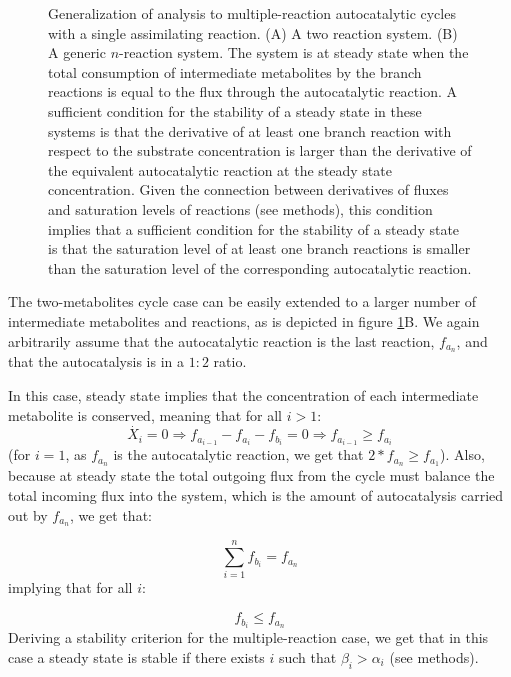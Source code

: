\begin{figure}[!htb]
  \centering
      
     \caption{
     Generalization of analysis to multiple-reaction autocatalytic cycles with a single assimilating reaction.
     (A) A two reaction system.
     (B) A generic $n$-reaction system.
     The system is at steady state when the total consumption of intermediate metabolites by the branch reactions is equal to the flux through the autocatalytic reaction.
     A sufficient condition for the stability of a steady state in these systems is that the derivative of at least one branch reaction with respect to the substrate concentration is larger than the derivative of the equivalent autocatalytic reaction at the steady state concentration.
     Given the connection between derivatives of fluxes and saturation levels of reactions (see methods), this condition implies that a sufficient condition for the stability of a steady state is that the saturation level of at least one branch reactions is smaller than the saturation level of the corresponding autocatalytic reaction.
 }
     \label{fig:multiple}
\end{figure}

    The two-metabolites cycle case can be easily extended to a larger number of intermediate metabolites and reactions, as is depicted in figure \ref{fig:multiple}B.
    We again arbitrarily assume that the autocatalytic reaction is the last reaction, $f_{a_n}$, and that the autocatalysis is in a $1:2$ ratio.

    In this case, steady state implies that the concentration of each intermediate metabolite is conserved, meaning that for all $i>1$:
    \begin{equation}
        \label{eq:complexdecrease}
      \dot{X_i}=0 \Rightarrow f_{a_{i-1}}-f_{a_i}-f_{b_i}=0 \Rightarrow f_{a_{i-1}} \geq f_{a_i}
    \end{equation}
    (for $i=1$, as $f_{a_n}$ is the autocatalytic reaction, we get that $2*f_{a_{n}} \geq f_{a_1}$).
    Also, because at steady state the total outgoing flux from the cycle must balance the total incoming flux into the system, which is the amount of autocatalysis carried out by $f_{a_n}$, we get that:

    \begin{equation*}
      \sum_{i=1}^n f_{b_i}=f_{a_n}
  \end{equation*}
implying that for all $i$:

    \begin{equation}
        \label{eq:complexsmallbranch}
        f_{b_i} \leq f_{a_n}
  \end{equation}
    Deriving a stability criterion for the multiple-reaction case, we get that in this case a steady state is stable if there exists $i$ such that $\beta_i > \alpha_i$ (see methods).

